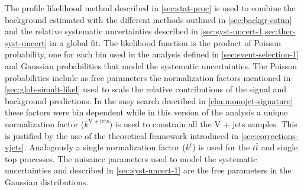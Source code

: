 The profile likelihood method described in \cref{sec:stat-proc} is used to
combine the background estimated with the different methods outlined in
\cref{sec:backgr-estim} and the relative systematic uncertainties described in
\cref{sec:syst-uncert-1,sec:ther-syst-uncert} in a global fit. The likelihood
function is the product of Poisson probability, one for each bin used in the
analysis defined in \cref{sec:event-selection-1} and Gaussian probabilities that
model the systematic uncertainties. The Poisson probabilities include as free
parameters the normalization factors mentioned in \cref{sec:glob-simult-likel}
used to scale the relative contributions of the signal and background
predictions. In the \gls{susy} search described in \cref{cha:monojet-signature}
these factors were bin dependent while in this version of the analysis a unique
normalization factor ($k^\mathrm{V + jets}$) is used to constrain all the V +
jets samples. This is justified by the use of the theoretical framework
introduced in \cref{sec:corrections-vjets}. Analogously a single normalization
factor ($k^t$) is used for the $t \bar{t}$ and single top processes. The
nuisance parameters used to model the systematic uncertainties and described in
\cref{sec:syst-uncert-1} are the free parameters in the Gaussian
distributions.


